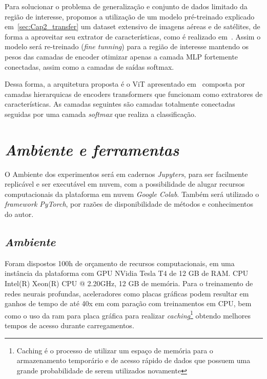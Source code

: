 Para solucionar o problema de generalização e conjunto de dados limitado da região de interesse, propomos a utilização de um modelo pré-treinado explicado em~\ref{sec:Cap2_transfer} um dataset extensivo de imagens aéreas e de satélites, de forma a aproveitar seu extrator de características, como é realizado em~\cite{wang2022empirical}. Assim o modelo será re-treinado (\textit{fine tunning}) para a região de interesse mantendo os pesos das camadas de encoder otimizar apenas a camada MLP fortemente conectadas, assim como a camadas de saídas softmax. 

Dessa forma, a arquitetura proposta é o ViT apresentado em~\cite{wang2022empirical}
composta por camadas hierarquicas de encoders transformers  que funcionam como extratores de características. As camadas seguintes são camadas totalmente conectadas seguidas por uma camada \textit{softmax} que realiza a classificação.

\section{\textit{Ambiente e ferramentas}}\label{sec:Cap3_Ferramentas}


O Ambiente dos experimentos será em cadernos \textit{Jupyters}, para ser facilmente replicável e ser executável em nuvem, com a possibilidade de alugar recursos computacionais da plataforma em nuvem \textit{Google Colab}. Também será utilizado o \textit{framework PyTorch}, por razões de disponibilidade de métodos e conhecimentos do autor. 


\subsection{\textit{Ambiente}}\label{sec:Cap2_Ambiente}

Foram dispostos 100h de orçamento de recursos computacionais, em uma instância da plataforma com GPU NVidia Tesla T4 de 12 GB de RAM. CPU Intel(R) Xeon(R) CPU @ 2.20GHz, 12 GB de memória. Para o treinamento de redes neurais profundas, aceleradores como placas gráficas podem resultar em ganhos de tempo de até 40x em com paração com treinamentos em CPU, bem como o uso da ram para placa gráfica para realizar \textit{caching}\footnote[1]{Caching é o processo de utilizar um espaço de memória para o armazenamento temporário e de acesso rápido de dados que possuem uma grande probabilidade de serem utilizados novamente} obtendo melhores tempos de acesso durante carregamentos.



